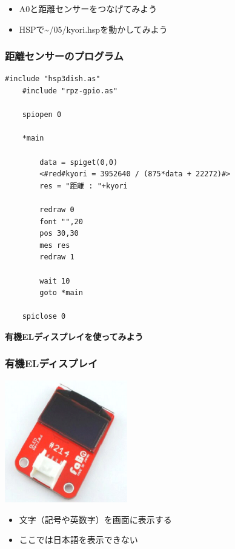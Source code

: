 \begin{frame}[fragile]
\begin{columns}
\begin{column}{0.48\textwidth}
        \end{column}
    \end{columns}
    \begin{itemize}
        \item A0と距離センサーをつなげてみよう
        \item HSPで\textasciitilde/05/kyori.hspを動かしてみよう
    \end{itemize}
\end{frame}

\begin{frame}[fragile]
    \frametitle{距離センサーのプログラム}
    \begin{lstlisting}[title=\textasciitilde/05/kyori.hsp]
    #include "hsp3dish.as"
    #include "rpz-gpio.as"

    spiopen 0

    *main

	    data = spiget(0,0)
	    <#red#kyori = 3952640 / (875*data + 22272)#>
	    res = "距離 : "+kyori
	
	    redraw 0
	    font "",20
	    pos 30,30
	    mes res
	    redraw 1

	    wait 10
	    goto *main

    spiclose 0
    \end{lstlisting}
\end{frame}

\begin{frame}[plain]
    \begin{center}
        \vspace{48pt}
        {\huge\bf 有機ELディスプレイを使ってみよう}
    \end{center}
\end{frame}

\begin{frame}
    \frametitle{有機ELディスプレイ}
    \begin{center}
        \includegraphics[width=0.4\textwidth]{images/chap05/text05-img025.png}
        \begin{itemize}
            \item 文字（記号や英数字）を画面に表示する
            \item ここでは日本語を表示できない
        \end{itemize}
    \end{center}
\end{frame}

